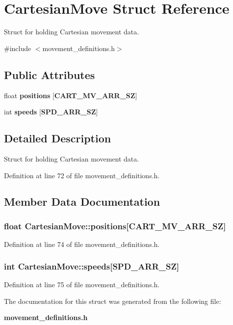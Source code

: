 \section{\-Cartesian\-Move \-Struct \-Reference}
\label{structCartesianMove}


\-Struct for holding \-Cartesian movement data.  




{\ttfamily \#include $<$movement\-\_\-definitions.\-h$>$}

\subsection*{\-Public \-Attributes}
\begin{DoxyCompactItemize}
\item 
float {\bf positions} [{\bf \-C\-A\-R\-T\-\_\-\-M\-V\-\_\-\-A\-R\-R\-\_\-\-S\-Z}]
\item 
int {\bf speeds} [{\bf \-S\-P\-D\-\_\-\-A\-R\-R\-\_\-\-S\-Z}]
\end{DoxyCompactItemize}


\subsection{\-Detailed \-Description}
\-Struct for holding \-Cartesian movement data. 

\-Definition at line 72 of file movement\-\_\-definitions.\-h.



\subsection{\-Member \-Data \-Documentation}
\subsubsection[{positions}]{\setlength{\rightskip}{0pt plus 5cm}float {\bf \-Cartesian\-Move\-::positions}[{\bf \-C\-A\-R\-T\-\_\-\-M\-V\-\_\-\-A\-R\-R\-\_\-\-S\-Z}]}\label{structCartesianMove_a5aca986f98b9c46901e768e3f6fa16d2}


\-Definition at line 74 of file movement\-\_\-definitions.\-h.

\subsubsection[{speeds}]{\setlength{\rightskip}{0pt plus 5cm}int {\bf \-Cartesian\-Move\-::speeds}[{\bf \-S\-P\-D\-\_\-\-A\-R\-R\-\_\-\-S\-Z}]}\label{structCartesianMove_af5e1acb2dc5b03d418a49c52f3c152a4}


\-Definition at line 75 of file movement\-\_\-definitions.\-h.



\-The documentation for this struct was generated from the following file\-:\begin{DoxyCompactItemize}
\item 
{\bf movement\-\_\-definitions.\-h}\end{DoxyCompactItemize}
